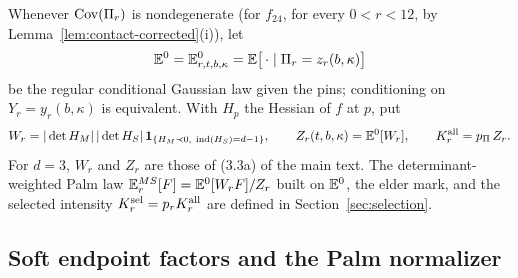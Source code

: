 \begin{definition}\label{def:contact-weight}
Whenever $\operatorname{Cov}(\Pi_r)$ is nondegenerate (for $f_{24}$, for every $0<r<12$, by Lemma~\ref{lem:contact-corrected}(i)), let
\[
\mathbb E^0=\mathbb E^0_{r,t,b,\kappa}=\mathbb E\bigl[\,\cdot\mid\Pi_r=z_r(b,\kappa)\bigr]
\]
be the regular conditional Gaussian law given the pins; conditioning on $Y_r=y_r(b,\kappa)$ is equivalent. With $H_p$ the Hessian of $f$ at $p$, put
\begin{equation}\label{eq:contact-weight}
W_r=|\det H_M|\,|\det H_S|\,\mathbf 1_{\{H_M\prec0,\ \operatorname{ind}(H_S)=d-1\}},\qquad Z_r(t,b,\kappa)=\mathbb E^0[W_r],\qquad K^{\rm all}_r=p_\Pi\,Z_r .
\end{equation}
For $d=3$, $W_r$ and $Z_r$ are those of (3.3a) of the main text. The determinant-weighted Palm law $\mathbb E^{MS}_r[F]=\mathbb E^0[W_rF]/Z_r$ built on $\mathbb E^0$, the elder mark, and the selected intensity $K^{\rm sel}_r=p_rK^{\rm all}_r$ are defined in Section~\ref{sec:selection}.
\end{definition}

\subsection{Soft endpoint factors and the Palm normalizer}\label{ssec:contact-soft}

